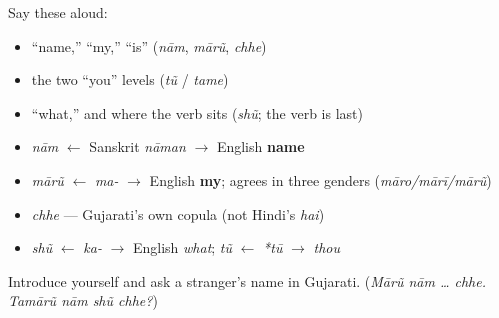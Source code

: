 \begin{cousinweb}
Say these aloud:

\begin{itemize}
\raggedright
  \item \textquotedblleft{}name,\textquotedblright{} \textquotedblleft{}my,\textquotedblright{} \textquotedblleft{}is\textquotedblright{} (\emph{nām}, \emph{mārũ}, \emph{chhe})
  \item the two \textquotedblleft{}you\textquotedblright{} levels (\emph{tũ} / \emph{tame})
  \item \textquotedblleft{}what,\textquotedblright{} and where the verb sits (\emph{shũ}; the verb is last)
\end{itemize}
\end{cousinweb}

\begin{grammarlens}[title={What you've built — roots you now carry}]
\begin{itemize}
\raggedright
  \item \emph{nām} $\leftarrow$ Sanskrit \emph{nāman} $\to$ English \textbf{name}
  \item \emph{mārũ} $\leftarrow$ \emph{ma-} $\to$ English \textbf{my}; agrees in three genders (\emph{māro/mārī/mārũ})
  \item \emph{chhe} — Gujarati's own copula (not Hindi's \emph{hai})
  \item \emph{shũ} $\leftarrow$ \emph{ka-} $\to$ English \emph{what}; \emph{tũ} $\leftarrow$ \emph{*tū} $\to$ \emph{thou}
\end{itemize}
\end{grammarlens}

\begin{tcolorbox}[breakable,colback=teal!4,colframe=teal!35!black,title={Before you move on}]
Introduce yourself and ask a stranger's name in Gujarati. (\emph{Mārũ nām … chhe. Tamārũ nām shũ chhe?})
\end{tcolorbox}
